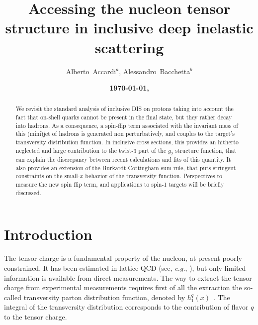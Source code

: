 \documentclass[preprintnumbers,floatfix,nofootinbib]{revtex4}
\newcommand{\eg}{{\em e.g.}}
\begin{document}


\title{Accessing the nucleon tensor structure in inclusive deep inelastic scattering} 

\author{Alberto~Accardi$^{a}$, Alessandro~Bacchetta$^{b}$} 

\date{\bf \today, \currenttime}

\begin{abstract}
We revisit the standard analysis of inclusive DIS on protons taking into account the fact that on-shell quarks cannot be present in the final state, but they rather decay into hadrons. As a consequence, a spin-flip term associated with the invariant mass of this (mini)jet of hadrons is generated non perturbatively, and couples to the target's transversity distribution function. In inclusive cross sections, this provides an hitherto neglected and large contribution to the twist-3 part of the $g_2$ structure function, that can explain the discrepancy between recent calculations and fits of this quantity. It also provides an extension of the Burkardt-Cottingham sum rule, that puts stringent constraints on the small-$x$ behavior of the transversity function. Perspectives to measure the new spin flip term, and applications to spin-1 targets will be briefly discussed.
\end{abstract}



\maketitle


\section{Introduction}

The tensor charge is a fundamental property of the nucleon, at
present poorly constrained. It has been estimated in lattice
QCD (see, \eg,
\cite{Green:2012ej,Bali:2014nma,Bhattacharya:2015wna,Abdel-Rehim:2015ow}), but
only limited information is available from direct measurements. The
way to extract the tensor charge from experimental measurements requires first
of all the extraction the so-called transversity parton distribution function,
denoted by $h_1^q(x)$~\cite{Radici:2015mwa,Anselmino:2015sxa,Kang:2015msa}. 
The integral of the transversity distribution
corresponds to the contribution of flavor $q$ to the tensor charge.
\end{document}
